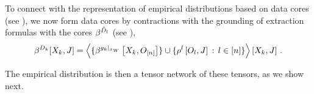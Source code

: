 To connect with the representation of empirical distributions based on data cores (see ), we now form data cores by contractions with the grounding of extraction formulas with the cores $\beta^{\tilde{D}_{l}}$ (see ),
\begin{align*}
    \beta^{D_{k}}[X_{k},J]
    = \left\langle 
        \{\beta^{{g_{k}}|_{x_{W}}}\left[X_{k},O_{[n]}\right]\}
        \cup \{ \rho^{l}\left[O_{l},J\right] \,:\, l\in[n]\}
    \right\rangle \left[ X_{k},J \right] \, .
\end{align*}

The empirical distribution is then a tensor network of these tensors, as we show next.


